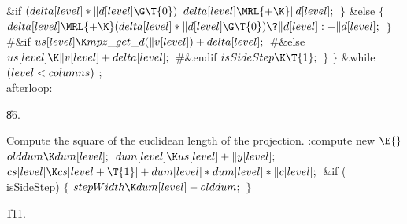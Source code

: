 \&{if} ${}(\\{delta}[\\{level}]*\|d[\\{level}]\G\T{0}){}$\1\5
${}\\{delta}[\\{level}]\MRL{+{\K}}\|d[\\{level}];{}$\2\6
\4${}\}{}$\2\6
\&{else}\5
${}\{{}$\1\6
${}\\{delta}[\\{level}]\MRL{+{\K}}(\\{delta}[\\{level}]*\|d[\\{level}]\G\T{0})%
\?\|d[\\{level}]:{-}\|d[\\{level}];{}$\6
\4${}\}{}$\2\6
\8\#\&{if} \6
${}\\{us}[\\{level}]\K\\{mpz\_get\_d}(\|v[\\{level}])+\\{delta}[\\{level}];{}$\6
\8\#\&{else}\6
${}\\{us}[\\{level}]\K\|v[\\{level}]+\\{delta}[\\{level}];{}$\6
\8\#\&{endif}\6
${}\\{isSideStep}\K\T{1};{}$\6
\4${}\}{}$\2\6
\4${}\}{}$\2\6
\&{while} ${}(\\{level}<\\{columns}){}$\1\5
;\2\6
\\{afterloop}:\par
\U86.\fi

Compute the square of the euclidean length of
the projection.
\Y\B\4:compute new \X${}\E{}$\6
$\\{olddum}\K\\{dum}[\\{level}];{}$\6
${}\\{dum}[\\{level}]\K\\{us}[\\{level}]+\|y[\\{level}];{}$\6
${}\\{cs}[\\{level}]\K\\{cs}[\\{level}+\T{1}]+\\{dum}[\\{level}]*\\{dum}[%
\\{level}]*\|c[\\{level}];{}$\6
\&{if} (\\{isSideStep})\5
${}\{{}$\1\6
${}\\{stepWidth}\K\\{dum}[\\{level}]-\\{olddum};{}$\6
\4${}\}{}$\2\par
\U111.\fi

